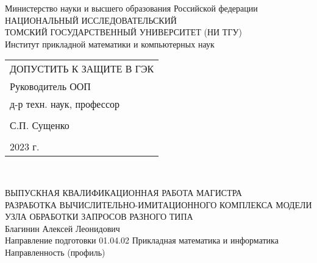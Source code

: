 \begin{center}\linespread{1}
	\normalsize{Министерство науки и высшего образования Российской федерации}\\
	\normalsize{НАЦИОНАЛЬНЫЙ ИССЛЕДОВАТЕЛЬСКИЙ}\\ 
	\normalsize{ТОМСКИЙ ГОСУДАРСТВЕННЫЙ УНИВЕРСИТЕТ (НИ ТГУ)}\\
	\normalsize{Институт прикладной математики и компьютерных наук}\\
	\hfill\break
	
\end{center}
\begin{flushright}\linespread{0.9}
	\normalsize{ 
		\begin{tabular}{@{}l@{}}
			ДОПУСТИТЬ К ЗАЩИТЕ В ГЭК\\ 
			Руководитель ООП\\  д-р техн. наук,  профессор\\\\ \underline{\hspace{3.5cm}} С.П. Сущенко\\\\
			\textquote{\underline{\hspace{1cm}}}\underline{\hspace{4cm}}2023 г.	
		\end{tabular}	
	}\\
\end{flushright}
\hfill \break
\hfill \break
\begin{center}\linespread{1}
	\large{ВЫПУСКНАЯ КВАЛИФИКАЦИОННАЯ РАБОТА МАГИСТРА}\\
	\hfill \break
	\large{РАЗРАБОТКА ВЫЧИСЛИТЕЛЬНО-ИМИТАЦИОННОГО КОМПЛЕКСА МОДЕЛИ УЗЛА ОБРАБОТКИ ЗАПРОСОВ РАЗНОГО ТИПА}\\
	\hfill\break
	\normalsize{Благинин Алексей Леонидович}\\
	\hfill \break
	\normalsize{Направление подготовки 01.04.02 Прикладная математика и информатика\\
	Направленность (профиль)  }\\
		\hfill \break
	\hfill \break
	\hfill \break
\end{center}
